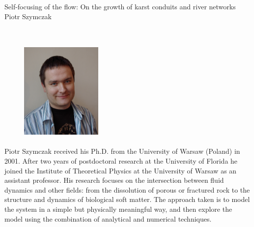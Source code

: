     { 
			{Self-focusing of the flow: On the growth of karst conduits and river networks} \\ 			
    \normalfont\small Piotr Szymczak }
    
    {  \\    
    } 
      {  } 
	\vspace{1cm} 
	\begin{figure}
		\vspace{-20pt}
		\begin{center}
			\includegraphics[width=4cm,height=5cm,keepaspectratio]{invited_img/szymczak}
		\end{center}
		\vspace{-20pt}
		\vspace{-10pt}
	\end{figure}
	Piotr Szymczak received his Ph.D. from the University of Warsaw (Poland) in 2001. After two years of postdoctoral research at the University of Florida he joined the Institute of Theoretical Physics at the University of Warsaw as an assistant professor. His research focuses on the intersection between fluid dynamics and other fields: from the dissolution of porous or fractured rock to the structure and dynamics of biological soft matter. The approach taken is to model the system in a simple but physically meaningful way, and then explore the model using the combination of analytical and numerical techniques.
	
